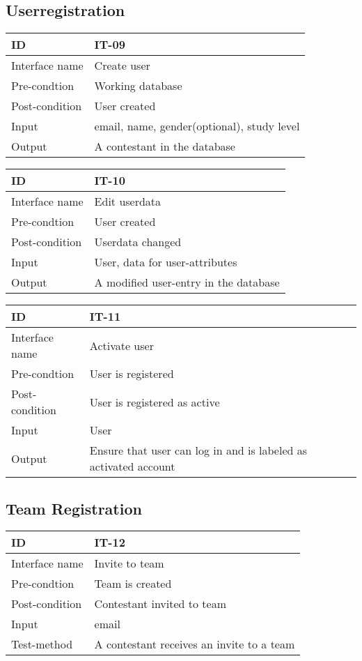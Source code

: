 \subsection{Userregistration}


\begin{longtable}{|l|p{}|}
\hline
ID & IT-09\\\hline
Interface name & Create user\\\hline
Pre-condtion & Working database\\\hline
Post-condition & User created\\\hline
Input & email, name, gender(optional), study level\\\hline
Output & A contestant in the database\\\hline
\end{longtable}


\begin{longtable}{|l|p{}|}
\hline
ID & IT-10\\\hline
Interface name & Edit userdata\\\hline
Pre-condtion & User created\\\hline
Post-condition & Userdata changed\\\hline
Input & User, data for user-attributes\\\hline
Output & A modified user-entry in the database\\\hline
\end{longtable}


\begin{longtable}{|l|p{}|}
\hline
ID & IT-11\\\hline
Interface name & Activate user\\\hline
Pre-condtion & User is registered\\\hline
Post-condition & User is registered as active\\\hline
Input & User\\\hline
Output & Ensure that user can log in and is labeled as activated
account\\\hline
\end{longtable}

\subsection{Team Registration}

\begin{longtable}{|l|p{}|}
\hline
ID & IT-12\\\hline
Interface name & Invite to team\\\hline
Pre-condtion & Team is created\\\hline
Post-condition & Contestant invited to team\\\hline
Input & email\\\hline
Test-method & A contestant receives an invite to a team\\\hline
\end{longtable}


